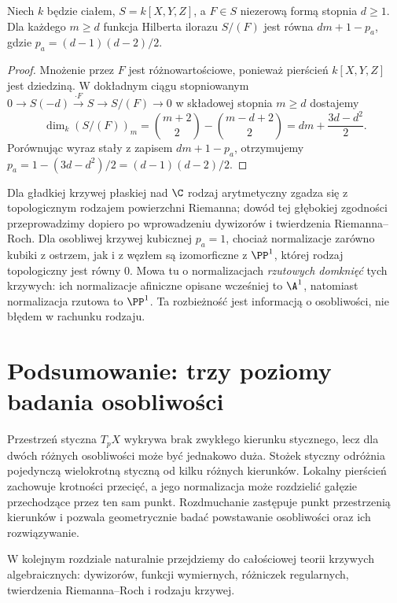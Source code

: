 \begin{twierdzenie}
\label{tw:arithmetic-genus-plane}
Niech $k$ będzie ciałem, $S=k[X,Y,Z]$, a $F\in S$
niezerową formą stopnia $d\ge1$. Dla każdego $m\ge d$
funkcja Hilberta ilorazu $S/(F)$ jest równa $dm+1-p_a$,
gdzie $p_a=(d-1)(d-2)/2$.
\end{twierdzenie}
\begin{proof}
Mnożenie przez $F$ jest różnowartościowe,
ponieważ pierścień $k[X,Y,Z]$ jest dziedziną.
W dokładnym ciągu stopniowanym
$0\to S(-d)\xrightarrow{\cdot F}S\to S/(F)\to0$
w składowej stopnia $m\ge d$ dostajemy
\[
 \dim_k(S/(F))_m=\binom{m+2}{2}-\binom{m-d+2}{2}
 =dm+\frac{3d-d^2}{2}.
\]
Porównując wyraz stały z zapisem $dm+1-p_a$,
otrzymujemy $p_a=1-(3d-d^2)/2=(d-1)(d-2)/2$.
\end{proof}

\begin{uwaga}
Dla gładkiej krzywej płaskiej nad $\C$ rodzaj
arytmetyczny zgadza się z topologicznym rodzajem
powierzchni Riemanna; dowód tej głębokiej zgodności
przeprowadzimy dopiero po wprowadzeniu dywizorów
i twierdzenia Riemanna--Roch. Dla osobliwej krzywej
kubicznej $p_a=1$, chociaż normalizacje zarówno
kubiki z ostrzem, jak i z węzłem są izomorficzne
z $\PP^1$, której rodzaj topologiczny jest równy $0$.
Mowa tu o normalizacjach \emph{rzutowych domknięć}
tych krzywych: ich normalizacje afiniczne opisane wcześniej
to $\A^1$, natomiast normalizacja rzutowa to $\PP^1$.
Ta rozbieżność jest informacją o osobliwości, nie błędem
w rachunku rodzaju.
\end{uwaga}

\section{Podsumowanie: trzy poziomy badania osobliwości}

Przestrzeń styczna $T_pX$ wykrywa brak zwykłego kierunku
stycznego, lecz dla dwóch różnych osobliwości może być
jednakowo duża. Stożek styczny odróżnia pojedynczą
wielokrotną styczną od kilku różnych kierunków.
Lokalny pierścień zachowuje krotności przecięć, a jego
normalizacja może rozdzielić gałęzie przechodzące przez
ten sam punkt. Rozdmuchanie zastępuje punkt przestrzenią
kierunków i pozwala geometrycznie badać powstawanie
osobliwości oraz ich rozwiązywanie.

W kolejnym rozdziale naturalnie przejdziemy do
całościowej teorii krzywych algebraicznych:
dywizorów, funkcji wymiernych, różniczek regularnych,
twierdzenia Riemanna--Roch i rodzaju krzywej.


